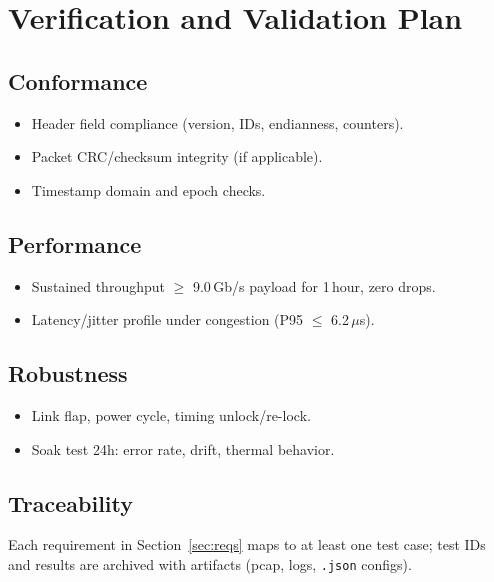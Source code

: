 
\section{Verification and Validation Plan}
\label{sec:vv}
\subsection{Conformance}
\begin{itemize}
  \item Header field compliance (version, IDs, endianness, counters).
  \item Packet CRC/checksum integrity (if applicable).
  \item Timestamp domain and epoch checks.
\end{itemize}

\subsection{Performance}
\begin{itemize}
  \item Sustained throughput $\ge$ 9.0\,Gb/s payload for 1\,hour, zero drops.
  \item Latency/jitter profile under congestion (P95 $\le$ 6.2\,$\mu$s).
\end{itemize}

\subsection{Robustness}
\begin{itemize}
  \item Link flap, power cycle, timing unlock/re-lock.
  \item Soak test 24h: error rate, drift, thermal behavior.
\end{itemize}

\subsection{Traceability}
Each requirement in Section~\ref{sec:reqs} maps to at least one test case; test IDs and results are archived with artifacts
(pcap, logs, \texttt{.json} configs). 
